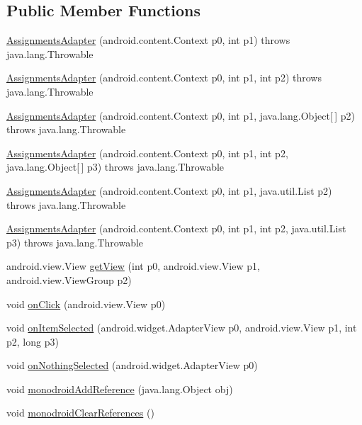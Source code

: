 \subsection*{Public Member Functions}
\begin{DoxyCompactItemize}
\item 
\hyperlink{classfieldservice_1_1android_1_1_assignments_adapter_aed64b493e12bc2611d0b9c866f71e4bb}{Assignments\+Adapter} (android.\+content.\+Context p0, int p1)  throws java.\+lang.\+Throwable 	
\item 
\hyperlink{classfieldservice_1_1android_1_1_assignments_adapter_a856de2053e4799909bb937ae1c34e08b}{Assignments\+Adapter} (android.\+content.\+Context p0, int p1, int p2)  throws java.\+lang.\+Throwable 	
\item 
\hyperlink{classfieldservice_1_1android_1_1_assignments_adapter_a6efc828188bcc1550f1a205ade7e9478}{Assignments\+Adapter} (android.\+content.\+Context p0, int p1, java.\+lang.\+Object\mbox{[}$\,$\mbox{]} p2)  throws java.\+lang.\+Throwable 	
\item 
\hyperlink{classfieldservice_1_1android_1_1_assignments_adapter_a013d8a7b65a21b056c2554c59b9c6721}{Assignments\+Adapter} (android.\+content.\+Context p0, int p1, int p2, java.\+lang.\+Object\mbox{[}$\,$\mbox{]} p3)  throws java.\+lang.\+Throwable 	
\item 
\hyperlink{classfieldservice_1_1android_1_1_assignments_adapter_a30e3b5fe3f8cd04c6ec3a7cd80c95e84}{Assignments\+Adapter} (android.\+content.\+Context p0, int p1, java.\+util.\+List p2)  throws java.\+lang.\+Throwable 	
\item 
\hyperlink{classfieldservice_1_1android_1_1_assignments_adapter_a8b09eadb9125cb0bde7a1182d6bf7d7d}{Assignments\+Adapter} (android.\+content.\+Context p0, int p1, int p2, java.\+util.\+List p3)  throws java.\+lang.\+Throwable 	
\item 
android.\+view.\+View \hyperlink{classfieldservice_1_1android_1_1_assignments_adapter_aad2d63ef93c61b5e7379111ec522ad90}{get\+View} (int p0, android.\+view.\+View p1, android.\+view.\+View\+Group p2)
\item 
void \hyperlink{classfieldservice_1_1android_1_1_assignments_adapter_a0d30397221c41840c0c2180314631134}{on\+Click} (android.\+view.\+View p0)
\item 
void \hyperlink{classfieldservice_1_1android_1_1_assignments_adapter_a79892bf8b176bc256ef0b305a625d87e}{on\+Item\+Selected} (android.\+widget.\+Adapter\+View p0, android.\+view.\+View p1, int p2, long p3)
\item 
void \hyperlink{classfieldservice_1_1android_1_1_assignments_adapter_a9b80f3a4f80152d11c89b574cb05fc12}{on\+Nothing\+Selected} (android.\+widget.\+Adapter\+View p0)
\item 
void \hyperlink{classfieldservice_1_1android_1_1_assignments_adapter_a9e258f1dff01e5bb4d12fdbdf83f6f86}{monodroid\+Add\+Reference} (java.\+lang.\+Object obj)
\item 
void \hyperlink{classfieldservice_1_1android_1_1_assignments_adapter_a112c76ab279f046b4534308756a4c6f1}{monodroid\+Clear\+References} ()
\end{DoxyCompactItemize}


